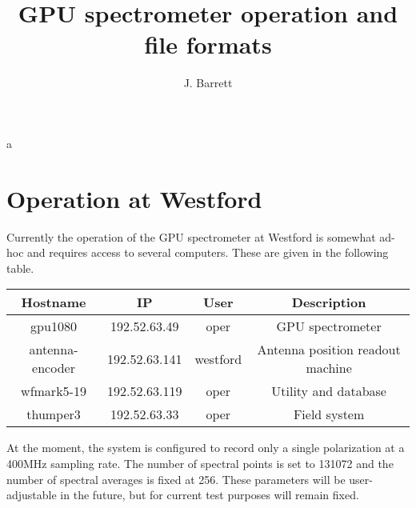 a\documentclass[a4paper,14pt]{article}
\title{GPU spectrometer operation and file formats}
\author{J. Barrett}
\begin{document}
\maketitle


\section{Operation at Westford}

Currently the operation of the GPU spectrometer at Westford is somewhat ad-hoc and requires access to several computers. These are given in the following table.

\begin{center}
\begin{tabular}{| c | c | c | c |}
\hline
 Hostname & IP & User & Description \\  \hline
 gpu1080 & 192.52.63.49 & oper & GPU spectrometer \\ \hline
 antenna-encoder & 192.52.63.141 & westford & Antenna position readout machine \\ \hline
 wfmark5-19 & 192.52.63.119 & oper & Utility and database \\ \hline
 thumper3 & 192.52.63.33 & oper & Field system \\ \hline
\end{tabular}
\end{center}

At the moment, the system is configured to record only a single polarization at a 400MHz sampling rate. The number of spectral points is set to 131072 and the
number of spectral averages is fixed at 256. These parameters will be user-adjustable in the future, but for current test purposes will remain fixed.
\end{document}
